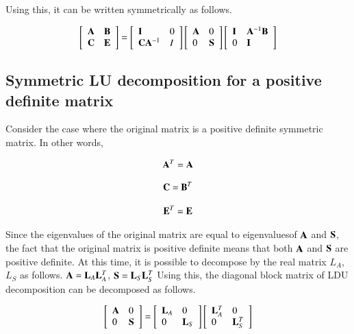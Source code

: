 Using this, it can be written symmetrically as follows.

\begin{eqnarray}
\left[\begin{array}{ll}
\mathbf{A} & \mathbf{B}\\
\mathbf{C} & \mathbf{E}
\end{array}\right]
=
\left[\begin{array}{ll}
\mathbf{I} & 0\\
\mathbf{C}\mathbf{A}^{-1} & I\end{array}\right]
\left[\begin{array}{ll}
\mathbf{A} & 0 \\
0 & \mathbf{S}
\end{array}\right]
\left[\begin{array}{ll}
\mathbf{I} & \mathbf{A}^{-1}\mathbf{B}\\
0 & \mathbf{I}
\end{array}\right]
\end{eqnarray}


\subsection{Symmetric LU decomposition for a positive definite matrix}

Consider the case where the original matrix is ​​a positive definite symmetric matrix. In other words,

\begin{equation}
\mathbf{A}^T = \mathbf{A}
\end{equation}


\begin{equation}
\mathbf{C} = \mathbf{B}^T
\end{equation}


\begin{equation}
\mathbf{E}^T = \mathbf{E}
\end{equation}

Since the eigenvalues ​​of the original matrix are equal to eigenvalues ​​of $\mathbf{A}$ and $\mathbf{S}$, the fact that the original matrix is ​​positive definite means that both $\mathbf{A}$ and $\mathbf{S}$ are positive definite. 
%
At this time, it is possible to decompose by the real matrix $L_A$, $L_S$ as follows.
$\mathbf{A}=\mathbf{L}_A \mathbf{L}_A^T$, $\mathbf{S}=\mathbf{L}_S \mathbf{L}_S^T$
Using this, the diagonal block matrix of LDU decomposition can be decomposed as follows.

\begin{eqnarray}
\left[\begin{array}{ll}
\mathbf{A} & 0 \\
0 & \mathbf{S}
\end{array}\right]
=
\left[\begin{array}{ll}
\mathbf{L}_A & 0 \\
0 & \mathbf{L}_S
\end{array}\right]
\left[\begin{array}{ll}
\mathbf{L}_A^T & 0 \\
0 & \mathbf{L}_S^T
\end{array}\right]
\end{eqnarray}

